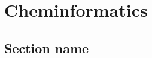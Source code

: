 \documentclass[a4paper,11pt,twoside,openright]{scrbook}
\begin{document}
\chapter{Cheminformatics} \label{chapter:cheminformatics}

\section{Section name}




\end{document}
